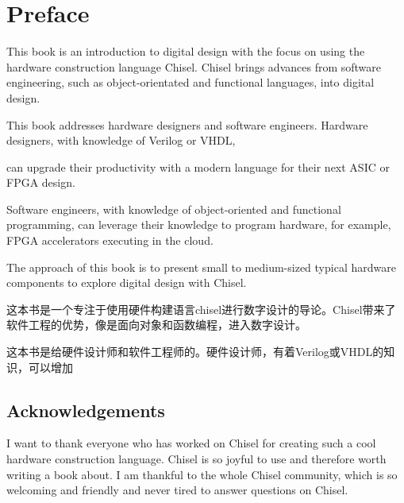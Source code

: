 \documentclass[%
    10pt,
    headinclude, footexclude,
    openright, %
    notitlepage,
    cleardoubleempty,
    headsepline,
    pointlessnumbers,
    bibtotoc, idxtotoc,
    ]{scrbook}
\begin{document}
\chapter{Preface}


This book is an introduction to digital design with the focus on using the hardware construction language Chisel. Chisel brings advances from software engineering, such as object-orientated and functional languages, into digital design.

This book addresses hardware designers and software engineers. Hardware designers, with knowledge of Verilog or VHDL, 

can upgrade their productivity with a modern language for their next ASIC or FPGA design. 

Software engineers, with knowledge of object-oriented and functional programming, can leverage their knowledge to program hardware, for example, FPGA accelerators executing in the cloud.

The approach of this book is to present small to medium-sized typical hardware components to explore digital design with Chisel.

这本书是一个专注于使用硬件构建语言chisel进行数字设计的导论。Chisel带来了软件工程的优势，像是面向对象和函数编程，进入数字设计。

这本书是给硬件设计师和软件工程师的。硬件设计师，有着Verilog或VHDL的知识，可以增加





\section*{Acknowledgements}

I want to thank everyone who has worked on Chisel for creating such
a cool hardware construction language. Chisel is so joyful to use and
therefore worth writing a book about.
I am thankful to the whole Chisel community, which is so welcoming and friendly
and never tired to answer questions on Chisel.
\end{document}
